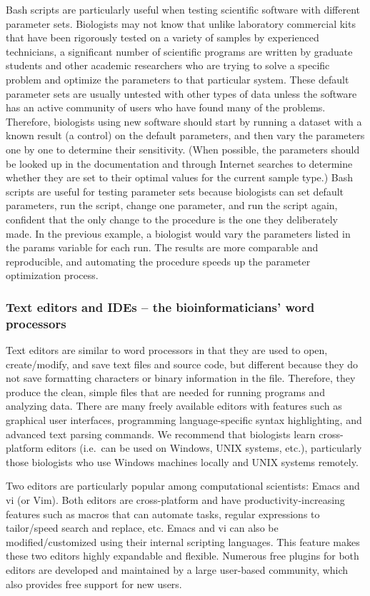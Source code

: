 \documentclass[ChapterTOCs,krantz2]{krantz} %
\newcommand{\unix}{UNIX}
\begin{document}
Bash scripts are particularly useful when testing scientific software with
different parameter sets.  Biologists may not know that
unlike laboratory commercial kits that have been rigorously tested on a
variety of samples by experienced technicians, a significant
number of scientific programs are written by graduate students and other
academic researchers who are trying to solve a specific problem and optimize
the parameters to that particular system.  These default parameter sets are
usually untested with other types of data unless the software
has an active community of users who
have found many of the problems.  Therefore, biologists using new software should start by running a dataset with a known result (a control) on
the default parameters, and then vary the parameters one by one to determine
their sensitivity.  (When possible, the parameters should be looked up in the
documentation and through Internet searches to determine whether they are set
to their optimal values for the current sample type.)  Bash scripts are useful
for testing parameter sets because biologists can set default parameters, run
the script, change one parameter, and run the script again, confident that the
only change to the procedure is the one they deliberately made.  In the
previous example, a biologist would vary the parameters listed in the params
variable for each run.  The results are more comparable and reproducible, and automating the procedure speeds up the parameter optimization process.

\subsubsection{Text editors and IDEs -- the bioinformaticians' word processors}

Text editors are 
similar to word processors in that they are used to open, create/modify, and save text files and source code, but different because they
do not save formatting characters or binary information in the file.
Therefore, they produce the clean, simple files that are needed for running programs
and analyzing data.  There are many freely available editors with features such
as graphical user interfaces, programming language-specific syntax
highlighting, and advanced text parsing commands. 
We recommend that biologists learn cross-platform editors
(i.e.\ can be used on Windows, \unix{} systems, etc.), particularly
those biologists who use Windows machines locally and \unix{} systems
remotely.

Two editors are particularly popular among computational scientists: Emacs and vi (or Vim).
Both editors are cross-platform and have productivity-increasing features 
such as macros that can automate tasks, regular expressions to 
tailor/speed search and replace, etc.
Emacs and vi can also be modified/customized using 
their internal scripting languages.
This feature makes these two editors highly expandable and flexible.
Numerous free plugins for both editors are developed and maintained by a
large user-based community, which also provides free support for new users.
\end{document}
